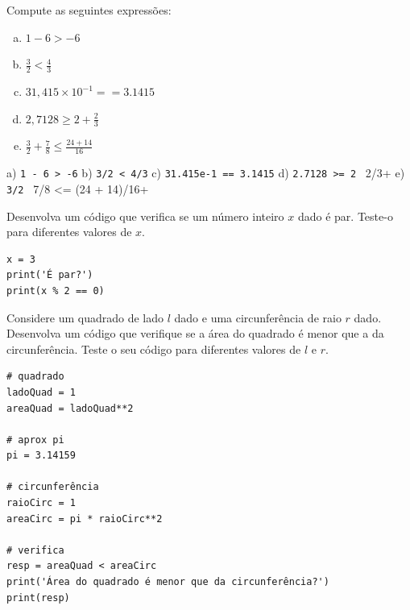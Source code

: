 \begin{exer}
  Compute as seguintes expressões:
  \begin{enumerate}[a)]
  \item $1 - 6 > -6$
  \item $\frac{3}{2} < \frac{4}{3}$
  \item $31,415\times 10^{-1} == 3.1415$
  \item $\displaystyle 2,7128 \geq 2 + \frac{2}{3}$
  \item $\displaystyle \frac{3}{2} + \frac{7}{8} \leq \frac{24 + 14}{16}$
  \end{enumerate}
\end{exer}
\begin{resp}
  a) \lstinline+1 - 6 > -6+ b) \lstinline+3/2 < 4/3+ c) \lstinline+31.415e-1 == 3.1415+ d) \lstinline+2.7128 >= 2 + 2/3+ e) \lstinline+3/2 + 7/8 <= (24 + 14)/16+
\end{resp}

\begin{exer}
  Desenvolva um código que verifica se um número inteiro $x$ dado é par. Teste-o para diferentes valores de $x$.
\end{exer}
\begin{resp}

\begin{lstlisting}
x = 3
print('É par?')
print(x % 2 == 0)
\end{lstlisting}

\end{resp}

\begin{exer}
  Considere um quadrado de lado $l$ dado e uma circunferência de raio $r$ dado. Desenvolva um código que verifique se a área do quadrado é menor que a da circunferência. Teste o seu código para diferentes valores de $l$ e $r$.
\end{exer}
\begin{resp}

\begin{lstlisting}
# quadrado
ladoQuad = 1
areaQuad = ladoQuad**2

# aprox pi
pi = 3.14159

# circunferência
raioCirc = 1
areaCirc = pi * raioCirc**2

# verifica
resp = areaQuad < areaCirc
print('Área do quadrado é menor que da circunferência?')
print(resp)
\end{lstlisting}

\end{resp}

